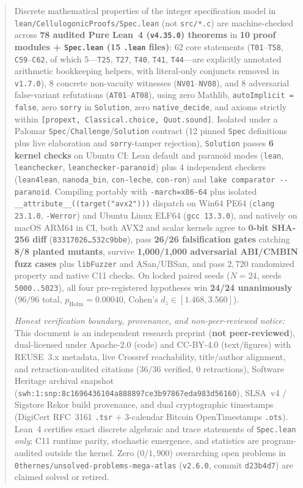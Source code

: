 \documentclass[11pt,reqno]{amsart}
\theoremstyle{plain}
\theoremstyle{definition}
\theoremstyle{remark}
\newcommand{\code}[1]{{\footnotesize\nolinkurl{#1}}}
\begin{document}
\begin{abstract}
Discrete mathematical properties of the integer specification model in \code{lean/CellulogonicProofs/Spec.lean} (not \code{src/*.c}) are machine-checked across \textbf{78 audited Pure Lean~4 (\texttt{v4.35.0}) theorems} in \textbf{10 proof modules + \code{Spec.lean} (15 \code{.lean} files)}: 62 core statements (\texttt{T01}--\texttt{T58}, \texttt{C59}--\texttt{C62}, of which 5---\texttt{T25}, \texttt{T27}, \texttt{T40}, \texttt{T41}, \texttt{T44}---are explicitly annotated arithmetic bookkeeping helpers, with literal-only conjuncts removed in \texttt{v1.7.0}), 8 concrete non-vacuity witnesses (\texttt{NV01}--\texttt{NV08}), and 8 adversarial false-variant refutations (\texttt{AT01}--\texttt{AT08}), using zero Mathlib, \code{autoImplicit = false}, zero \code{sorry} in \code{Solution}, zero \code{native_decide}, and axioms strictly within \code{[propext, Classical.choice, Quot.sound]}. Isolated under a Palomar \code{Spec}/\code{Challenge}/\code{Solution} contract (12 pinned \code{Spec} definitions plus live elaboration and \code{sorry}-tamper rejection), \code{Solution} passes \textbf{6 kernel checks} on Ubuntu CI: Lean default and paranoid modes (\code{lean}, \code{leanchecker}, \code{leanchecker-paranoid}) plus 4 independent checkers (\code{lean4lean}, \code{nanoda_bin}, \code{con-leche}, \code{con-ron}) and \code{lake comparator --paranoid}. Compiling portably with \code{-march=x86-64} plus isolated \code{__attribute__((target("avx2")))} dispatch on Win64 PE64 (\texttt{clang 23.1.0}, \texttt{-Werror}) and Ubuntu Linux ELF64 (\texttt{gcc 13.3.0}), and natively on macOS ARM64 in CI, both AVX2 and scalar kernels agree to \textbf{0-bit SHA-256 diff} (\texttt{83317026\ldots 532c9bbe}), pass \textbf{26/26 falsification gates} catching \textbf{8/8 planted mutants}, survive \textbf{1,000/1,000 adversarial ABI/CMBIN fuzz cases} plus \code{libFuzzer} and ASan/UBSan, and pass $2{,}720$ randomized property and native C11 checks. On locked paired seeds ($N = 24$, seeds \texttt{5000..5023}), all four pre-registered hypotheses win \textbf{24/24 unanimously} ($96/96$ total, $p_{\mathrm{Holm}} = 0.00040$, Cohen's $d_z \in [1.468, 3.560]$).

\emph{Honest verification boundary, provenance, and non-peer-reviewed notice:} This document is an independent research preprint (\textbf{not peer-reviewed}), dual-licensed under Apache-2.0 (code) and CC-BY-4.0 (text/figures) with REUSE~3.x metadata, live Crossref reachability, title/author alignment, and retraction-audited citations ($36/36$ verified, $0$ retractions), Software Heritage archival snapshot (\code{swh:1:snp:8c1696436104a888897ce3b97867eda983d56160}), SLSA~v4 / Sigstore Rekor build provenance, and dual cryptographic timestamps (DigiCert RFC~3161 \code{.tsr} + 3-calendar Bitcoin OpenTimestamps \code{.ots}). Lean~4 certifies exact discrete algebraic and trace statements of \code{Spec.lean} \emph{only}; C11 runtime parity, stochastic emergence, and statistics are program-audited outside the kernel. Zero ($0 / 1{,}900$) overarching open problems in \code{0thernes/unsolved-problems-mega-atlas} (\texttt{v2.6.0}, commit \texttt{d23b4d7}) are claimed solved or retired.
\end{abstract}
\end{document}
